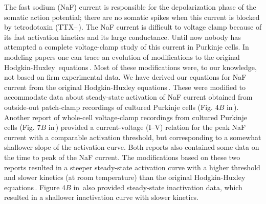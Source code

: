 \documentclass[12pt]{article}
\begin{document}
The fast sodium (NaF) current is responsible for the depolarization phase of the somatic action potential; there are no somatic spikes when this current is blocked by tetrodotoxin (TTX--\,\cite{R:1980ly}). The NaF current is difficult to voltage clamp because of its fast activation kinetics and its large conductance. Until now nobody has attempted a complete voltage-clamp study of this current in Purkinje cells. In modeling papers one can trace an evolution of modifications to the original Hodgkin-Huxley\,\cite{hodgkin52:_quantitative_description} equations\,\cite{W:1991qa, D:1982lh, Wilson:1989ff}. Most of these modifications were, to our knowledge, not based on firm experimental data. We have derived our equations for NaF current from the original Hodgkin-Huxley equations\,\cite{hodgkin52:_quantitative_description}. These were modified to accommodate data about steady-state activation of NaF current obtained from outside-out patch-clamp recordings of cultured Purkinje cells (Fig. 4$B$ in\,\cite{Gahwiler:1989fk}). Another report of whole-cell voltage-clamp recordings from cultured Purkinje cells (Fig. 7$B$ in\,\cite{Hirano:1989uq}) provided a current-voltage (I--V) relation for the peak NaF current with a comparable activation threshold, but corresponding to a somewhat shallower slope of the activation curve. Both reports also contained some data on the time to peak of the NaF current. The modifications based on these two reports resulted in a steeper steady-state activation curve with a higher threshold and slower kinetics (at room temperature) than the original Hodgkin-Huxley equations\,\cite{hodgkin52:_quantitative_description}. Figure 4$B$ in\,\cite{Gahwiler:1989fk} also provided steady-state inactivation data, which resulted in a shallower inactivation curve with slower kinetics.



\end{document}
